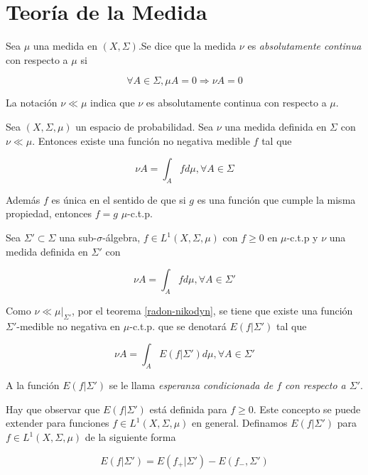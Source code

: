 \section{Teoría de la Medida}

\begin{definicion}
	Sea $\mu$ una medida en $(X,\Sigma)$.Se dice que la medida $\nu$ es \textit{absolutamente continua} con respecto a $\mu$ si
	
	\begin{equation}
		\forall A \in \Sigma, \mu A = 0 \Rightarrow \nu A = 0
	\end{equation}
	
	La notación $\nu \ll \mu$ indica que $\nu$ es absolutamente continua con respecto a $\mu$.
\end{definicion}

\begin{teorema}\label{radon-nikodyn}
	Sea $(X,\Sigma,\mu)$ un espacio de probabilidad. Sea $\nu$ una medida definida en $\Sigma$ con $\nu \ll \mu$. Entonces existe una función no negativa medible $f$ tal que
	
	\begin{equation}
		\nu A = \int_A f d\mu, \forall A \in \Sigma
	\end{equation}
	
	Además $f$ es única en el sentido de que si $g$ es una función que cumple la misma propiedad, entonces $f = g$ $\mu$-c.t.p.
\end{teorema}

\begin{definicion}
	Sea $\Sigma' \subset \Sigma$ una sub-$\sigma$-álgebra, $f \in L^1(X,\Sigma,\mu)$ con $f \geq 0$ en $\mu$-c.t.p y $\nu$ una medida definida en $\Sigma'$ con
	
	\begin{equation}
		\nu A = \int_A f d\mu, \forall A \in \Sigma'
	\end{equation}
	
	Como $\nu \ll \mu|_{\Sigma'}$, por el teorema \ref*{radon-nikodyn}, se tiene que existe una función $\Sigma'$-medible no negativa en $\mu$-c.t.p. que se denotará $E(f|\Sigma')$ tal que
	
	\begin{equation}
		\nu A = \int_A E(f|\Sigma') d\mu, \forall A \in \Sigma'
	\end{equation}
	
	A la función $E(f|\Sigma')$ se le llama \textit{esperanza condicionada de $f$ con respecto a $\Sigma'$}. 
\end{definicion}

Hay que observar que $E(f|\Sigma')$ está definida para $f \geq 0$. Este concepto se puede extender para funciones $f \in L^1(X,\Sigma,\mu)$ en general. Definamos $E(f|\Sigma')$ para $f \in L^1(X,\Sigma,\mu)$ de la siguiente forma

\begin{equation}
	E(f|\Sigma') = E(f_+|\Sigma')- E(f_-,\Sigma')
\end{equation}